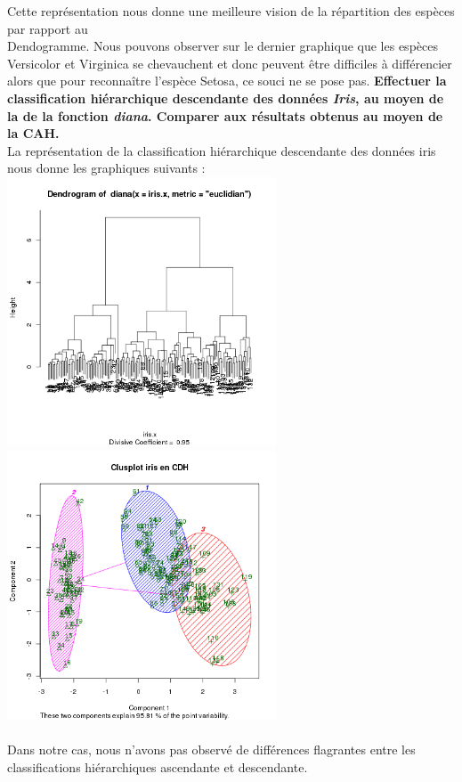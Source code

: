 \documentclass[a4paper, 10pt]{article}
\begin{document}
Cette repr\'esentation nous donne une meilleure vision de la r\'epartition des esp\`eces par rapport au\\Dendogramme.
Nous pouvons observer sur le dernier graphique que les esp\`eces Versicolor et Virginica se chevauchent et donc
peuvent \^etre difficiles \`a diff\'erencier alors que pour reconna\^itre l'esp\`ece Setosa, ce souci ne se pose pas.
\newpage
\noindent 
\textbf{Effectuer la classification hi\'erarchique descendante des donn\'ees \textit{Iris}, au moyen de la de la fonction \textit{diana}.
Comparer aux r\'esultats obtenus au moyen de la CAH.}\\
La repr\'esentation de la classification hi\'erarchique descendante des donn\'ees iris nous donne les graphiques suivants :\\
\includegraphics[height = 8cm, width = 8cm]{plots/plot_euclidian_1.png}
\includegraphics[height = 8cm, width = 8cm]{plots/clusplot_kmeans_10.png}\\ \\
Dans notre cas, nous n'avons pas observ\'e de diff\'erences flagrantes entre les classifications hi\'erarchiques ascendante et descendante.\\ \\ \\
\end{document}
